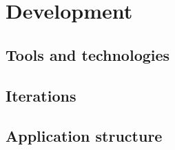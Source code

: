 
\chapter{Development} %

\label{Chapter4} %


\section{Tools and technologies}


\section{Iterations}


\section{Application structure}

